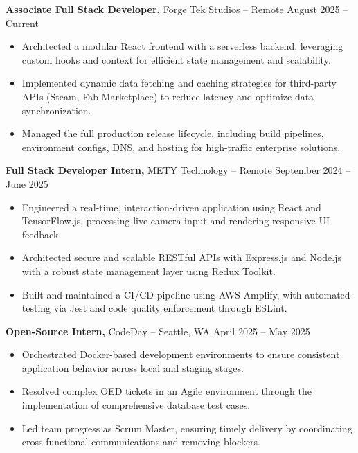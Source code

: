 \documentclass[11pt]{article}       %
\begin{document}
\textbf{Associate Full Stack Developer,} {Forge Tek Studios} -- Remote \hfill August 2025 -- Current 
\vspace{-9pt}
\begin{itemize}
  \item Architected a modular React frontend with a serverless backend, leveraging custom hooks and context for efficient state management and scalability.
  \item Implemented dynamic data fetching and caching strategies for third-party APIs (Steam, Fab Marketplace) to reduce latency and optimize data synchronization.
  \item Managed the full production release lifecycle, including build pipelines, environment configs, DNS, and hosting for high-traffic enterprise solutions.
\end{itemize}

\textbf{Full Stack Developer Intern,} {METY Technology} -- Remote \hfill September 2024 -- June 2025 
\vspace{-9pt}
\begin{itemize}
  \item Engineered a real-time, interaction-driven application using React and TensorFlow.js, processing live camera input and rendering responsive UI feedback.
  \item Architected secure and scalable RESTful APIs with Express.js and Node.js with a robust state management layer using Redux Toolkit.
  \item Built and maintained a CI/CD pipeline using AWS Amplify, with automated testing via Jest and code quality enforcement through ESLint.
\end{itemize}

\textbf{Open-Source Intern,} {CodeDay} -- Seattle, WA \hfill April 2025 -- May 2025 \\
\vspace{-9pt}
\begin{itemize}
  \item Orchestrated Docker-based development environments to ensure consistent application behavior across local and staging stages.
  \item Resolved complex OED tickets in an Agile environment through the implementation of comprehensive database test cases.
  \item Led team progress as Scrum Master, ensuring timely delivery by coordinating cross-functional communications and removing blockers.
\end{itemize}
\end{document}
